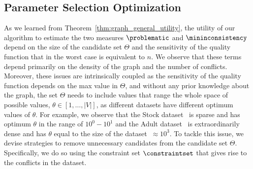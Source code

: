 \subsection{Parameter Selection Optimization}\label{sec:dc_aware}
As we learned from Theorem~\ref{thm:graph_general_utility}, the utility of our algorithm to estimate the two measures $\problematic$ and $\mininconsistency$ depend on the size of the candidate set $\Theta$ and the sensitivity of the quality function that in the worst case is equivalent to $n$.
We observe that these terms depend primarily on the density of the graph and the number of conflicts. Moreover, these issues are intrinsically coupled as the sensitivity of the quality function depends on the max value in $\Theta$, and without any prior knowledge about the graph, the set $\Theta$ needs to include values that range the whole space of possible values, $\theta \in [1, \dots, |V|]$, as different datasets have different optimum values of $\theta$.  For example, we observe that the Stock dataset~\cite{oleh_onyshchak_2020} is sparse and has optimum $\theta$ in the range of $10^0-10^1$ and the Adult dataset~\cite{misc_adult_2} is extraordinarily dense and has $\theta$ equal to the size of the dataset $~\approx 10^3$. To tackle this issue, we devise strategies to remove unnecessary candidates from the candidate set $\Theta$. Specifically, we do so using the constraint set $\constraintset$ that gives rise to the conflicts in the dataset. 



